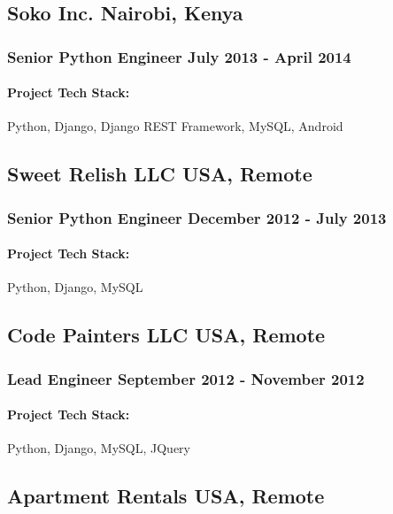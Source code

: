 \documentclass[11pt]{article} %
\begin{document}
\subsection{Soko Inc. \hfill Nairobi, Kenya}
\subsubsection{Senior Python Engineer \hfill  July 2013 - April 2014}
\begin{itemize}
    \paragraph{Project Tech Stack:} Python, Django, Django REST Framework, MySQL, Android
\end{itemize}

\subsection{Sweet Relish LLC \hfill USA, Remote}
\subsubsection{Senior Python Engineer \hfill  December 2012 - July 2013}
\begin{itemize}
    \paragraph{Project Tech Stack:} Python, Django, MySQL
\end{itemize}

\subsection{Code Painters LLC \hfill USA, Remote}
\subsubsection{Lead Engineer \hfill  September 2012 - November 2012}
\begin{itemize}
    \paragraph{Project Tech Stack:} Python, Django, MySQL, JQuery
\end{itemize}

\subsection{Apartment Rentals \hfill USA, Remote}
\end{document}
